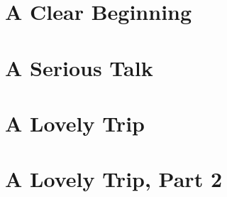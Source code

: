 \documentclass[oneside,11pt]{memoir} %
\begin{document}
\chapter{A Clear Beginning}




\chapter{A Serious Talk}



\chapter{A Lovely Trip}



\chapter{A Lovely Trip, Part 2}

\end{document}
